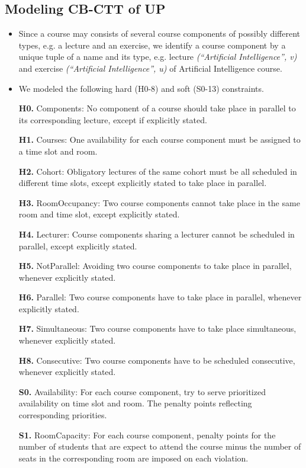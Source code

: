 \documentclass{easychair}
\newcommand{\CBCTT}{CB-CTT}
\newcommand{\UP}{UP}
\begin{document}
\subsection{Modeling \CBCTT{} of \UP{}}
\label{subsec:modeling}
\begin{itemize}%
  \item%
  Since a course may consists of several course components of possibly different types, e.g. a lecture and an exercise, we identify a course component by a unique tuple of a name and its type, e.g. lecture \textit{(``Artificial Intelligence'', v)} and exercise \textit{(``Artificial Intelligence'', u)} of Artificial Intelligence course. 
  \item%
  We modeled the following hard (H0-8) and soft (S0-13) constraints. 

  \textbf{H0.} Components: No component of a course should take place in parallel to its corresponding lecture, except if explicitly stated. 

  \textbf{H1.} Courses: One availability for each course component must be assigned to a time slot and room. 

  \textbf{H2.} Cohort: Obligatory lectures of the same cohort must be all scheduled in different time slots, except explicitly stated to take place in parallel. 

  \textbf{H3.} RoomOccupancy: Two course components cannot take place in the same room and time slot, except explicitly stated. 

  \textbf{H4.} Lecturer: Course components sharing a lecturer cannot be scheduled in parallel, except explicitly stated. 

  \textbf{H5.} NotParallel: Avoiding two course components to take place in parallel, whenever explicitly stated.

  \textbf{H6.} Parallel: Two course components have to take place in parallel, whenever explicitly stated.

  \textbf{H7.} Simultaneous: Two course components have to take place simultaneous, whenever explicitly stated.

  \textbf{H8.} Consecutive: Two course components have to be scheduled consecutive, whenever explicitly stated.

  \textbf{S0.} Availability: For each course component, try to serve prioritized availability on time slot and room. The penalty points reflecting corresponding priorities.  

  \textbf{S1.} RoomCapacity: For each course component, penalty points for the number of students that are expect to attend the course minus the number of seats in the corresponding room are imposed on each violation. 


\end{itemize}
\end{document}
